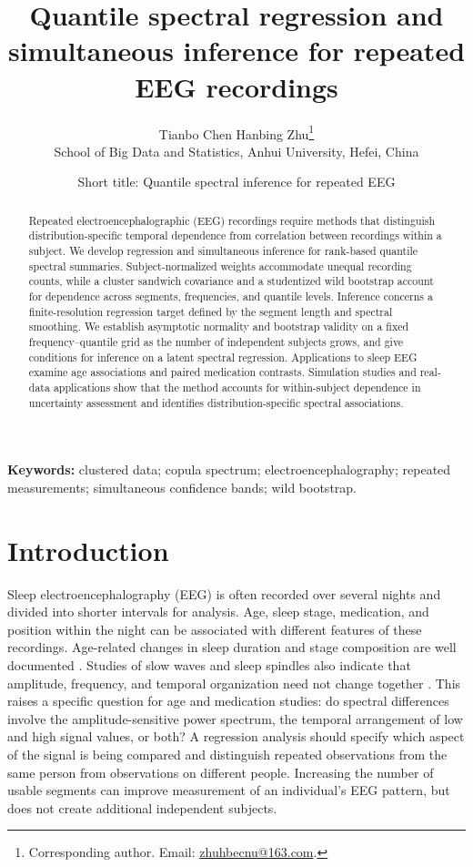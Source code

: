 \documentclass[12pt,a4paper]{article}
\title{Quantile spectral regression and simultaneous inference for repeated EEG recordings}
\author{Tianbo Chen \quad Hanbing Zhu\thanks{Corresponding author. Email: \href{mailto:zhuhbecnu@163.com}{zhuhbecnu@163.com}.}\\[4pt]
\small School of Big Data and Statistics, Anhui University, Hefei, China}
\date{\small Short title: Quantile spectral inference for repeated EEG}
\begin{document}
\maketitle
\begin{abstract}
Repeated electroencephalographic (EEG) recordings require methods that distinguish distribution-specific temporal dependence from correlation between recordings within a subject. We develop regression and simultaneous inference for rank-based quantile spectral summaries. Subject-normalized weights accommodate unequal recording counts, while a cluster sandwich covariance and a studentized wild bootstrap account for dependence across segments, frequencies, and quantile levels. Inference concerns a finite-resolution regression target defined by the segment length and spectral smoothing. We establish asymptotic normality and bootstrap validity on a fixed frequency--quantile grid as the number of independent subjects grows, and give conditions for inference on a latent spectral regression. Applications to sleep EEG examine age associations and paired medication contrasts. Simulation studies and real-data applications show that the method accounts for within-subject dependence in uncertainty assessment and identifies distribution-specific spectral associations.
\end{abstract}
\noindent\textbf{Keywords:} clustered data; copula spectrum; electroencephalography; repeated measurements; simultaneous confidence bands; wild bootstrap.

\section{Introduction}\label{sec:intro}
Sleep electroencephalography (EEG) is often recorded over several nights and divided into shorter intervals for analysis. Age, sleep stage, medication, and position within the night can be associated with different features of these recordings. Age-related changes in sleep duration and stage composition are well documented \citep{Ohayon2004}. Studies of slow waves and sleep spindles also indicate that amplitude, frequency, and temporal organization need not change together \citep{Mourtazaev1995,Purcell2017}. This raises a specific question for age and medication studies: do spectral differences involve the amplitude-sensitive power spectrum, the temporal arrangement of low and high signal values, or both? A regression analysis should specify which aspect of the signal is being compared and distinguish repeated observations from the same person from observations on different people. Increasing the number of usable segments can improve measurement of an individual's EEG pattern, but does not create additional independent subjects.
\end{document}
